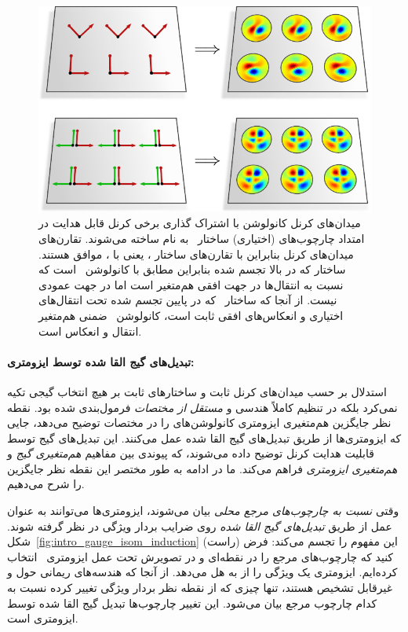 \begin{figure}
	\centering
	\includegraphics[width=.62\textwidth]{figures/intro_invariant_kernel_fields_plane.pdf}
	\captionsetup{width=.92\textwidth}
	\caption{\small
		میدان‌های کرنل کانولوشن \mbox{\lr{$\GM$}} با اشتراک گذاری برخی کرنل قابل هدایت  در امتداد چارچوب‌های (اختیاری) \mbox{ساختار } به نام \lr{$\GM$} ساخته می‌شوند.
		تقارن‌های میدان‌های کرنل بنابراین با تقارن‌های ساختار ، یعنی با ، موافق هستند.
		ساختار  که در بالا تجسم شده بنابراین مطابق با \mbox{کانولوشن \lr{$\GM$}} است که نسبت به انتقال‌ها در جهت افقی هم‌متغیر است اما در جهت عمودی نیست.
		از آنجا که \mbox{ساختار } که در پایین تجسم شده تحت انتقال‌های اختیاری و انعکاس‌های افقی ثابت است، \mbox{کانولوشن \lr{$\GM$}} ضمنی هم‌متغیر انتقال و انعکاس است.
		\\[-5pt]
	}
	\label{fig:intro_invariant_kernel_fields_plane}
\end{figure}






\paragraph{تبدیل‌های گیج القا شده توسط ایزومتری:}

استدلال بر حسب میدان‌های کرنل ثابت
و ساختارهای  ثابت بر هیچ انتخاب گیجی تکیه نمی‌کرد بلکه در تنظیم کاملاً هندسی و \emph{مستقل از مختصات} فرمول‌بندی شده بود.
نقطه نظر جایگزین هم‌متغیری ایزومتری کانولوشن‌های \lr{$\GM$} را در مختصات توضیح می‌دهد، جایی که ایزومتری‌ها از طریق تبدیل‌های گیج القا شده عمل می‌کنند.
این تبدیل‌های گیج توسط قابلیت هدایت  کرنل توضیح داده می‌شوند، که پیوندی بین مفاهیم \emph{هم‌متغیری گیج} و \emph{هم‌متغیری ایزومتری} فراهم می‌کند.
ما در ادامه به طور مختصر این نقطه نظر جایگزین را شرح می‌دهیم.


وقتی \emph{نسبت به چارچوب‌های مرجع محلی} بیان می‌شوند، ایزومتری‌ها می‌توانند به عنوان عمل از طریق \emph{تبدیل‌های گیج القا شده} روی ضرایب بردار ویژگی در نظر گرفته شوند.
شکل~\ref{fig:intro_gauge_isom_induction} (راست) این مفهوم را تجسم می‌کند:
فرض کنید که چارچوب‌های مرجع را در نقطه‌ای  و در تصویرش  تحت عمل ایزومتری~\lr{$\phi$} انتخاب کرده‌ایم.
ایزومتری یک ویژگی را از  به  هل می‌دهد.
از آنجا که هندسه‌های ریمانی حول  و  غیرقابل تشخیص هستند، تنها چیزی که از نقطه نظر بردار ویژگی تغییر کرده نسبت به کدام چارچوب مرجع بیان می‌شود.
این تغییر چارچوب‌ها تبدیل گیج القا شده توسط ایزومتری است.

